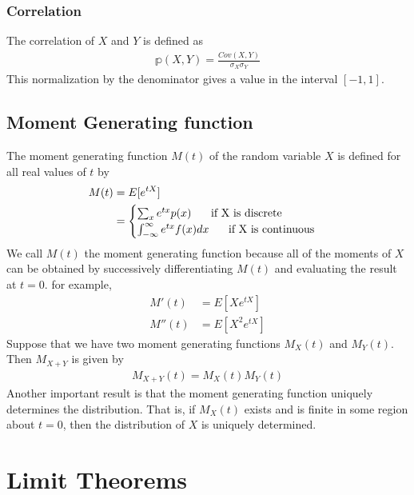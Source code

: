 \documentclass[a4paper]{article}
\begin{document}
\subsubsection{Correlation}
The correlation of $X$ and $Y$ is defined as 
\begin{align}
  \mathbb{p}(X,Y) = \frac{Cov(X,Y)}{\sigma_X\sigma_Y}
\end{align}
This normalization by the denominator gives a value in the interval $[-1,1]$.
\subsection{Moment Generating function} %
\label{sub:Moment Genereting function}
The moment generating function $M(t)$ of the random variable $X$ is defined for all real values of $t$ by
\begin{align}
  M(t) & = E[e^{tX}] \\ & =
  \begin{cases}
    \sum_{x}e^{tx} p(x) \hspace{.5 cm} \text{ if X is discrete} \\
    \int_{-\infty}^{\infty} e^{tx}f(x) dx \hspace{.5 cm} \text{ if X is continuous}
  \end{cases}
\end{align}
We call $M(t)$ the moment generating function because all of the moments of $X$ can be obtained by successively differentiating $M(t)$ and evaluating the result at $t=0$. for example,
\begin{align}
  M'(t) & = E[Xe^{tX}] \\
  M''(t) & = E[X^2e^{tX}]
\end{align}
Suppose that we have two moment generating functions $M_X(t)$ and $M_Y(t)$. Then $M_{X+Y}$ is given by
\begin{align}
  M_{X+Y}(t) = M_X(t)M_Y(t)
\end{align}
Another important result is that the moment generating function uniquely determines the distribution. That is, if $M_X(t)$ exists and is finite in some region about $t=0$, then the distribution of $X$ is uniquely determined.
\section{Limit Theorems} %
\label{sec:Limit Theorems}
\end{document}
